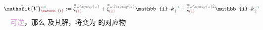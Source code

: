 \begin{align} \label{eq:plane_wave_basis-V1}
	\Xint{\mathcolor{gray}{-}}{25}{\bar{\bar{\mathsfit{V}}}}^{\;\! \mathcolor{gray}{\omega} \textcolor{PineGreen}{\imath}}_{\textcolor{Maroon}{\mathbb{1}}} := \bar{\bar{\zeta}}^{\;\! \mathcolor{gray}{\omega} \mathcolor{gray}{\symup{z}}}_{\textcolor{Maroon}{(1)}} + \bar{\bar{\zeta}}^{\;\! \mathcolor{gray}{\omega} \mathcolor{gray}{\check{1} \symup{z}}}_{\textcolor{Maroon}{(1)}} \mathbb{i} \Xint{\begin{smallmatrix} ~ \\ {}^{}_{\mathcolor{gray}{-}} \\ ~ \end{smallmatrix}}{15}{k}_{\;\! \mathcolor{gray}{\check{1}}}^{\;\! \mathcolor{gray}{\omega} \textcolor{PineGreen}{\imath}} + \bar{\bar{\zeta}}^{\;\! \mathcolor{gray}{\omega} \mathcolor{gray}{\symup{z} \check{2}}}_{\textcolor{Maroon}{(1)}} \mathbb{i} \Xint{\begin{smallmatrix} ~ \\ {}^{}_{\mathcolor{gray}{-}} \\ ~ \end{smallmatrix}}{15}{k}_{\;\! \mathcolor{gray}{\check{2}}}^{\;\! \mathcolor{gray}{\omega} \textcolor{PineGreen}{\imath}}
\end{align}
\textcolor{Plum}{可逆}，那么  及其解，将变为  的对应物
